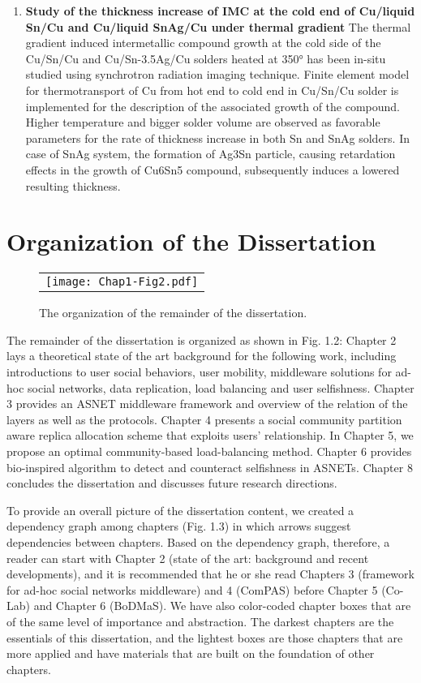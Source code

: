 \begin{enumerate}
    \item \textbf{Study of the thickness increase of IMC at the cold end of Cu/liquid Sn/Cu and Cu/liquid SnAg/Cu under thermal gradient}
    The thermal gradient induced intermetallic compound growth at the cold side of the Cu/Sn/Cu and Cu/Sn-3.5Ag/Cu solders heated at 350° has been in-situ studied using synchrotron radiation imaging technique. Finite element model for thermotransport of Cu from hot end to cold end in Cu/Sn/Cu solder is implemented for the description of the associated growth of the compound. Higher temperature and bigger solder volume are observed as favorable parameters for the rate of thickness increase in both Sn and SnAg solders. In case of SnAg system, the formation of Ag3Sn particle, causing retardation effects in the growth of Cu6Sn5 compound, subsequently induces a lowered resulting thickness.
\end{enumerate}

\section{Organization of the Dissertation}\label{Chap1_03}
\begin{figure}[h]
\begin{center}
  \begin{tabular}{c}
  \texttt{[image: Chap1-Fig2.pdf]}
  \end{tabular}
  \caption{The organization of the remainder of the dissertation.}
\end{center}
\end{figure}
The remainder of the dissertation is organized as shown in Fig. 1.2: Chapter 2 lays a theoretical state of the art background for the following work, including introductions to user social behaviors, user mobility, middleware solutions for ad-hoc social networks, data replication, load balancing and user selfishness. Chapter 3 provides an ASNET middleware framework and overview of the relation of the layers as well as the protocols. Chapter 4 presents a social community partition aware replica allocation scheme that exploits users' relationship. In Chapter 5, we propose an optimal community-based load-balancing method. Chapter 6 provides bio-inspired algorithm to detect and counteract selfishness in ASNETs. Chapter 8 concludes the dissertation and discusses future research directions.

To provide an overall picture of the dissertation content, we created a dependency graph among chapters (Fig. 1.3) in which arrows suggest dependencies between chapters. Based on the dependency graph, therefore, a reader can start with Chapter 2 (state of the art: background and recent developments), and it is recommended that he or she read Chapters 3 (framework for ad-hoc social networks middleware) and 4 (ComPAS) before Chapter 5 (Co-Lab) and Chapter 6 (BoDMaS). We have also color-coded chapter boxes that are of the same level of importance and abstraction. The darkest chapters are the essentials of this dissertation, and the lightest boxes are those chapters that are more applied and have materials that are built on the foundation of other chapters.

